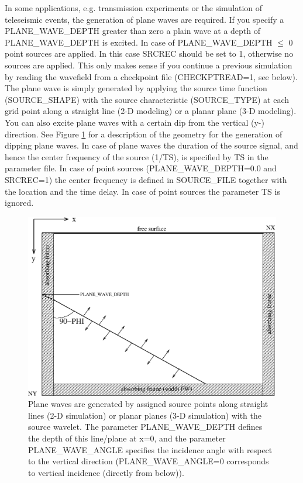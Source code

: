 \documentclass[11pt,onecolumn,oneside]{article}
\begin{document}
In some applications, e.g. transmission experiments or the simulation of teleseismic events, the generation of plane waves are required.  If you specify a PLANE\_WAVE\_DEPTH greater than zero a plain wave at a depth of PLANE\_WAVE\_DEPTH is excited. In case of PLANE\_WAVE\_DEPTH $\le$ 0 point sources are applied. In this case SRCREC should be set to 1, otherwise no sources are applied.
This only makes sense if you continue a previous simulation by reading the wavefield from a checkpoint file (CHECKPTREAD=1, see below). The plane wave is simply generated by applying the source time function (SOURCE\_SHAPE) with the source characteristic (SOURCE\_TYPE) at each grid point along a straight line (2-D modeling) or a planar plane (3-D modeling). You can also excite plane waves with a certain dip from the vertical (y-) direction. See Figure \ref{fig_plane_wave} for a description of the geometry for the generation of dipping plane waves. In case of plane waves the duration of the source signal, and hence the center frequency of the source (1/TS), is specified by TS in the parameter file. In case of point sources (PLANE\_WAVE\_DEPTH=0.0 and SRCREC=1) the center frequency is defined in SOURCE\_FILE together with the location and the time delay. In case of point sources the parameter TS is ignored.

\begin{figure}[htb]
\begin{center}
\includegraphics[width=12cm,angle=0]{eps/plane_wave.eps}
\end{center}
\caption{Plane waves are generated by assigned source points along  straight lines (2-D simulation) or planar planes (3-D simulation) with the source wavelet. The parameter PLANE\_WAVE\_DEPTH defines the depth of this line/plane at x=0, and the parameter PLANE\_WAVE\_ANGLE specifies the incidence angle with respect to the vertical direction (PLANE\_WAVE\_ANGLE=0 corresponds to vertical incidence (directly from below)).}
\label{fig_plane_wave}
\end{figure}
\end{document}
